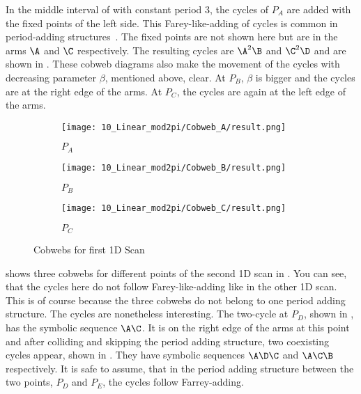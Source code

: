 In the middle interval of  with constant period 3, the cycles of $P_A$ are added with the fixed points of the left side.
This Farey-like-adding of cycles is common in period-adding structures~\cite{avrutin2019continuous}.
The fixed points are not shown here but are in the arms $\A$ and $\C$ respectively.
The resulting cycles are $\A^2\B$ and $\C^2\D$ and are shown in .
These cobweb diagrams also make the movement of the cycles with decreasing parameter $\beta$, mentioned above, clear.
At $P_B$, $\beta$ is bigger and the cycles are at the right edge of the arms.
At $P_C$, the cycles are again at the left edge of the arms.

\begin{figure}
	\centering
	\begin{subfigure}{0.3\textwidth}
		\centering
		\texttt{[image: 10\_Linear\_mod2pi/Cobweb\_A/result.png]}
		\caption{$P_A$}
		\label{fig:pcw.lin.CobwebA}
	\end{subfigure}
	\begin{subfigure}{0.3\textwidth}
		\centering
		\texttt{[image: 10\_Linear\_mod2pi/Cobweb\_B/result.png]}
		\caption{$P_B$}
		\label{fig:pcw.lin.CobwebB}
	\end{subfigure}
	\begin{subfigure}{0.3\textwidth}
		\centering
		\texttt{[image: 10\_Linear\_mod2pi/Cobweb\_C/result.png]}
		\caption{$P_C$}
		\label{fig:pcw.lin.CobwebC}
	\end{subfigure}
	\caption{Cobwebs for first 1D Scan}
	\label{fig:pcw.lin.CobwebA-C}
\end{figure}

 shows three cobwebs for different points of the second 1D scan in .
You can see, that the cycles here do not follow Farey-like-adding like in the other 1D scan.
This is of course because the three cobwebs do not belong to one period adding structure.
The cycles are nonetheless interesting.
The two-cycle at $P_D$, shown in , has the symbolic sequence $\A\C$.
It is on the right edge of the arms at this point and after colliding and skipping the period adding structure, two coexisting cycles appear, shown in .
They have symbolic sequences $\A\D\C$ and $\A\C\B$ respectively.
It is safe to assume, that in the period adding structure between the two points, $P_D$ and $P_E$, the cycles follow Farrey-adding.

